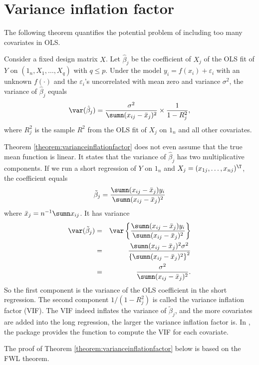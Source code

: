 \section{Variance inflation factor}


The following theorem quantifies the potential problem of including too many covariates in OLS. 

\begin{theorem}
\label{theorem:varianceinflationfactor}
Consider a fixed design matrix $X$.
Let $\hat{\beta}_{j}$ be the coefficient of $X_{j}$ of the OLS fit
of $Y$ on $(1_{n},X_{1},\ldots,X_{q} ) $ with $q \leq p$. Under the
model $y_{i}=f(x_{i})+\varepsilon_{i}$ with an unknown $f(\cdot)$ and the $\varepsilon_{i}$'s
uncorrelated with mean zero and variance $\sigma^{2}$, the variance
of $\hat{\beta}_{j}$ equals  
\[
\var(\hat{\beta}_{j})=\frac{\sigma^{2}}{\sumn(x_{ij}-\bar{x}_{j})^{2}}\times\frac{1}{1-R_{j}^{2}},
\]
where $R_{j}^{2}$ is the sample $R^{2}$ from the OLS fit of $X_{j}$
on $1_{n}$ and all other covariates. 
\end{theorem}



Theorem \ref{theorem:varianceinflationfactor} does not even assume that the true mean function is linear. It 
states that the variance
of $\hat{\beta}_{j}$ has two multiplicative components. If we run
a short regression of $Y$ on $1_{n}$ and $X_{j} = (x_{1j}, \ldots, x_{nj})^{\T}$, the coefficient equals
\[
\tilde{\beta}_{j}=\frac{\sumn(x_{ij}-\bar{x}_{j})y_{i}}{\sumn(x_{ij}-\bar{x}_{j})^{2}}
\]
where $\bar{x}_{j} = n^{-1} \sumn x_{ij}$. It
has variance
\begin{eqnarray*}
\var(\tilde{\beta}_{j}) &=& \var\left\{ \frac{\sumn(x_{ij}-\bar{x}_{j})y_{i}}{\sumn(x_{ij}-\bar{x}_{j})^{2}}\right\} \\
&=&\frac{\sumn(x_{ij}-\bar{x}_{j})^{2}\sigma^{2}}{\left\{ \sumn(x_{ij}-\bar{x}_{j})^{2}\right\} ^{2}} \\
&=&\frac{\sigma^{2}}{\sumn(x_{ij}-\bar{x}_{j})^{2}}.
\end{eqnarray*}
So the first component is the variance of the OLS coefficient in the
short regression. The second component $1/(1-R_{j}^{2})$ is called
the variance inflation factor (VIF). The VIF indeed inflates the variance
of $\tilde{\beta}_{j}$, and the more covariates are added into the
long regression, the larger the variance inflation factor is. 
In , the  package provides the function  to compute the VIF for each covariate. 

The proof of Theorem \ref{theorem:varianceinflationfactor} below is based
on the FWL theorem. 



